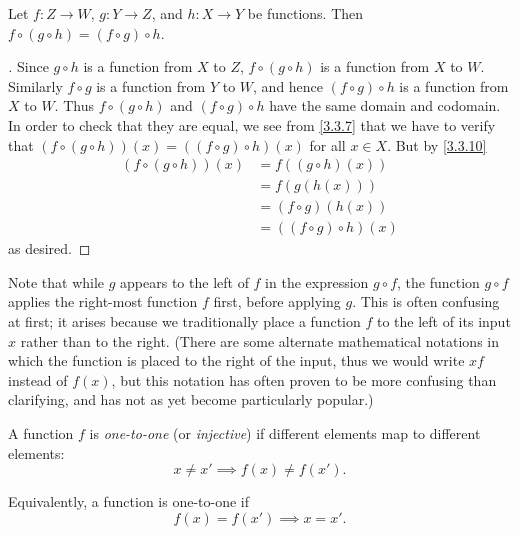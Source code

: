 \setcounter{thm}{11}
\begin{lem}\label{3.3.12}
  Let \(f : Z \to W\), \(g : Y \to Z\), and \(h : X \to Y\) be functions.
  Then \(f \circ (g \circ h) = (f \circ g) \circ h\).
\end{lem}

\begin{proof}[]
  Since \(g \circ h\) is a function from \(X\) to \(Z\), \(f \circ (g \circ h)\) is a function from \(X\) to \(W\).
  Similarly \(f \circ g\) is a function from \(Y\) to \(W\), and hence \((f \circ g) \circ h\) is a function from \(X\) to \(W\).
  Thus \(f \circ (g \circ h)\) and \((f \circ g) \circ h\) have the same domain and codomain.
  In order to check that they are equal, we see from \cref{3.3.7} that we have to verify that \((f \circ (g \circ h))(x) = ((f \circ g) \circ h)(x)\) for all \(x \in X\).
  But by \cref{3.3.10}
  \begin{align*}
    (f \circ (g \circ h))(x)
     & = f((g \circ h)(x))        \\
     & = f(g(h(x)))               \\
     & = (f \circ g)(h(x))        \\
     & = ((f \circ g) \circ h)(x)
  \end{align*}
  as desired.
\end{proof}

\begin{rmk}\label{3.3.13}
  Note that while \(g\) appears to the left of \(f\) in the expression \(g \circ f\), the function \(g \circ f\) applies the right-most function \(f\) first, before applying \(g\).
  This is often confusing at first;
  it arises because we traditionally place a function \(f\) to the left of its input \(x\) rather than to the right.
  (There are some alternate mathematical notations in which the function is placed to the right of the input, thus we would write \(xf\) instead of \(f(x)\), but this notation has often proven to be more confusing than clarifying, and has not as yet become particularly popular.)
\end{rmk}

\begin{defn}\label{3.3.14}
  A function \(f\) is \emph{one-to-one} (or \emph{injective}) if different elements map to different elements:
  \[
    x \neq x' \implies f(x) \neq f(x').
  \]

  Equivalently, a function is one-to-one if
  \[
    f(x) = f(x') \implies x = x'.
  \]
\end{defn}

